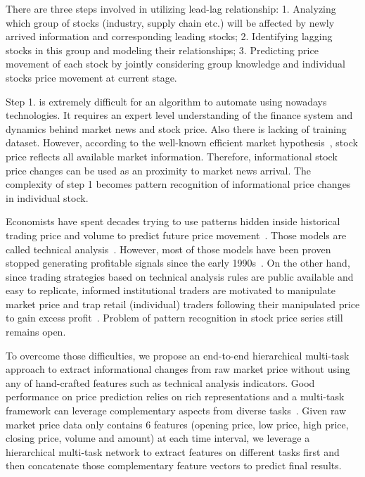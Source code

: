 \documentclass[sigconf, anonymous, review]{acmart}
\renewcommand{\cite}{\citep}
\begin{document}
There are three steps involved in utilizing lead-lag
relationship: 1. Analyzing which group of stocks (industry,
supply chain etc.) will be affected by newly arrived information
and corresponding leading stocks; 2. Identifying lagging stocks
in this group and modeling their relationships; 3. Predicting
price movement of each stock by jointly considering group
knowledge and individual stock\textquotesingle s price movement at current stage.

Step 1. is extremely difficult for an algorithm to automate using
nowadays technologies. It requires an expert level understanding
of the finance system and dynamics behind market news and stock
price. Also there is lacking of training dataset. However,
according to the well-known efficient market
hypothesis~\cite{malkiel1970efficient}, stock price reflects all
available market information. Therefore, informational stock
price changes can be used as an proximity to market news arrival.
The complexity of step 1 becomes pattern recognition of
informational price changes in individual stock.

Economists have spent decades trying to use patterns hidden
inside historical trading price and volume to predict future
price movement~\cite{fama1966filter,jensen1967random}. Those
models are called technical
analysis~\cite{kirkpatrick2010technical}. However, most of those
models have been proven stopped generating profitable signals
since the early 1990s~\cite{park2007we}. On the other hand, since
trading strategies based on technical analysis rules are public
available and easy to replicate, informed institutional traders
are motivated to manipulate market price and trap retail
(individual) traders following their manipulated price to gain
excess profit~\cite{sun2016decision}. Problem of pattern
recognition in stock price series still remains open.

To overcome those difficulties, we propose an end-to-end
hierarchical multi-task~\cite{caruana1993multitask} approach to
extract informational changes from raw market price without using
any of hand-crafted features such as technical analysis
indicators. Good performance on price prediction relies on rich
representations and a multi-task framework can leverage
complementary aspects from diverse tasks~\cite{sogaard2016deep}.
Given raw market price data only contains 6 features (opening
price, low price, high price, closing price, volume and amount)
at each time interval, we leverage a hierarchical multi-task
network to extract features on different tasks first and then
concatenate those complementary feature vectors to predict final
results.
\end{document}
